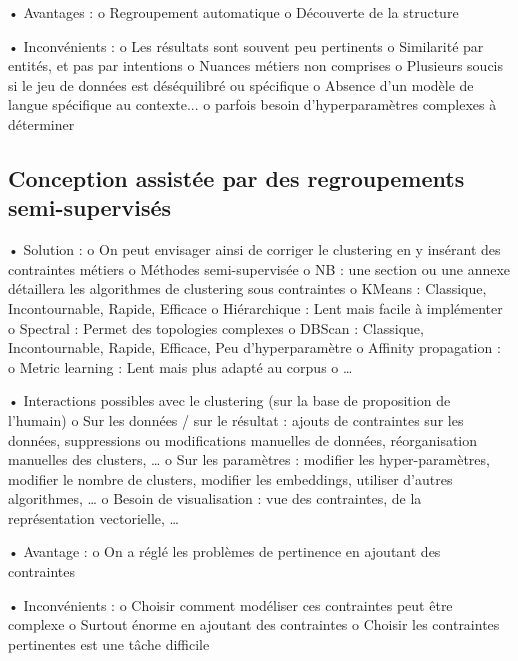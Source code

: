             •	Avantages :
                o	Regroupement automatique
                o	Découverte de la structure

            •	Inconvénients :
                o	Les résultats sont souvent peu pertinents
                o	Similarité par entités, et pas par intentions
                o	Nuances métiers non comprises
                o	Plusieurs soucis si le jeu de données est déséquilibré ou spécifique
                o	Absence d’un modèle de langue spécifique au contexte...
                o   parfois besoin d'hyperparamètres complexes à déterminer

        \subsection{Conception assistée par des regroupements semi-supervisés}

            •	Solution :
                o	On peut envisager ainsi de corriger le clustering en y insérant des contraintes métiers\hspace{2em}
                \cite{lampert:2018}
                o	Méthodes semi-supervisée
                o	NB : une section ou une annexe détaillera les algorithmes de clustering sous contraintes
					o	KMeans : Classique, Incontournable, Rapide, Efficace
					o	Hiérarchique : Lent mais facile à implémenter
					o	Spectral : Permet des topologies complexes
					o	DBScan : Classique, Incontournable, Rapide, Efficace, Peu d'hyperparamètre
					o	Affinity propagation : 
					o	Metric learning : Lent mais plus adapté au corpus
					o	…

            •   Interactions possibles avec le clustering (sur la base de proposition de l'humain)
                o	Sur les données / sur le résultat : ajouts de contraintes sur les données, suppressions ou modifications manuelles de données, réorganisation manuelles des clusters, …
                o	Sur les paramètres : modifier les hyper-paramètres, modifier le nombre de clusters, modifier les embeddings, utiliser d’autres algorithmes, …
                o	Besoin de visualisation : vue des contraintes, de la représentation vectorielle, …

            •	Avantage :
                o	On a réglé les problèmes de pertinence en ajoutant des contraintes

            •	Inconvénients : 
                o	Choisir comment modéliser ces contraintes peut être complexe
                o	Surtout énorme en ajoutant des contraintes
                o	Choisir les contraintes pertinentes est une tâche difficile

